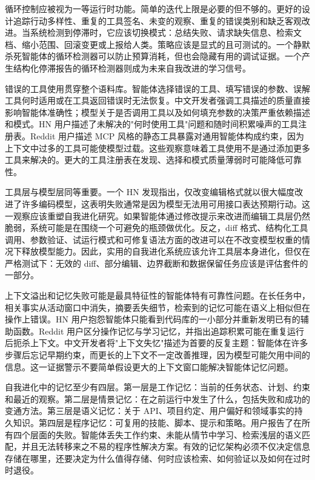 循环控制应被视为一等运行时功能。简单的迭代上限是必要的但不够的。更好的设计追踪行动多样性、重复的工具签名、未变的观察、重复的错误类别和缺乏客观改进。当系统检测到停滞时，它应该切换模式：总结失败、请求缺失信息、检索文档、缩小范围、回滚变更或上报给人类。策略应该是显式的且可测试的。一个静默杀死智能体的循环检测器可以防止预算消耗，但也会隐藏有用的调试证据。一个产生结构化停滞报告的循环检测器则成为未来自我改进的学习信号。

错误的工具使用贯穿整个语料库。智能体选择错误的工具、填写错误的参数、误解工具何时适用或在工具返回错误时无法恢复。中文开发者强调工具描述的质量直接影响智能体准确性；模型关于是否调用工具以及如何填充参数的决策严重依赖描述和模式。HN 用户描述了未解决的"何时使用工具"问题和随时间积累噪声的工具注册表。Reddit 用户描述 MCP 风格的静态工具暴露对通用智能体构成约束，因为上下文中过多的工具可能使模型过载。这些观察意味着工具使用不是通过添加更多工具来解决的。更大的工具注册表在发现、选择和模式质量薄弱时可能降低可靠性。

工具层与模型层同等重要。一个 HN 发现指出，仅改变编辑格式就以很大幅度改进了许多编码模型，这表明失败通常是因为模型无法用可用接口表达预期行动。这一观察应该重塑自我进化研究。如果智能体通过修改提示来改进而编辑工具层仍然脆弱，系统可能是在围绕一个可避免的瓶颈做优化。反之，diff 格式、结构化工具调用、参数验证、试运行模式和可修复语法方面的改进可以在不改变模型权重的情况下释放模型能力。因此，实用的自我进化系统应该允许工具层本身进化，但仅在严格测试下：无效的 diff、部分编辑、边界截断和数据保留任务应该是评估套件的一部分。

上下文溢出和记忆失败可能是最具特征性的智能体特有可靠性问题。在长任务中，相关事实从活动窗口中消失，摘要丢失细节，检索到的记忆可能在语义上相似但在操作上错误。HN 用户抱怨智能体只能看到代码库的一小部分并重新发明已有的辅助函数。Reddit 用户区分操作记忆与学习记忆，并指出追踪积累可能在重复运行后扼杀上下文。中文开发者将"上下文失忆"描述为首要的反复主题：智能体在许多步骤后忘记早期约束，而更长的上下文不一定改善推理，因为模型可能欠用中间的信息。这一证据警示不要简单假设更大的上下文窗口能解决智能体记忆问题。

自我进化中的记忆至少有四层。第一层是工作记忆：当前的任务状态、计划、约束和最近的观察。第二层是情景记忆：在之前运行中发生了什么，包括失败和成功的变通方法。第三层是语义记忆：关于 API、项目约定、用户偏好和领域事实的持久知识。第四层是程序记忆：可复用的技能、脚本、提示和策略。用户报告了在所有四个层面的失败。智能体丢失工作约束、未能从情节中学习、检索浅层的语义匹配，并且无法转移来之不易的程序性解决方案。有效的记忆架构必须不仅决定信息存储在哪里，还要决定为什么值得存储、何时应该检索、如何验证以及如何在过时时退役。

